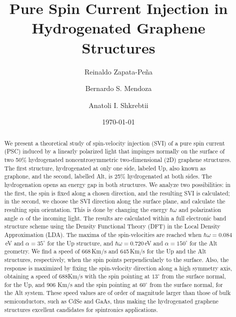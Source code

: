 \documentclass[floatfix,prb,aps,superscriptaddress,showpacs,11pt,preprint,letterpaper]{revtex4}
\begin{document}
\title{Pure Spin Current Injection in Hydrogenated Graphene Structures}
\author{Reinaldo Zapata-Pe\~na}
\author{Bernardo S. Mendoza}
\author{Anatoli I. Shkrebtii}

\date{\today}

\begin{abstract}
We present a theoretical study of spin-velocity injection (SVI) of a pure spin
current (PSC) induced by  a linearly polarized light that impinges normally on
the surface of  two 50\% hydrogenated noncentrosymmetric two-dimensional (2D)
graphene structures. The first structure, hydrogenated at only one side,
labeled Up, also known as graphone, and the second, labelled Alt, is
25\% hydrogenated at both sides. The hydrogenation opens an energy gap in both
structures. We analyze two possibilities: in the first, the spin is fixed
along a chosen direction, and the resulting SVI is calculated;
in the second, we choose the SVI direction along
the surface plane, and calculate the resulting
spin orientation. This is done by changing the energy
$\hbar\omega$ and polarization angle $\alpha$  of the incoming  light. The
results are calculated within a full electronic band structure scheme using the
Density Functional Theory (DFT) in the Local Density Approximation (LDA). The
maxima of the spin-velocities are reached when $\hbar\omega=0.084$\,eV and
$\alpha=35^\circ$ for the Up structure, and $\hbar\omega=0.720$\,eV and
$\alpha=150^\circ$ for the Alt geometry. We find a speed of 668\,Km/s and
645\,Km/s for the Up and the Alt structures, respectively, when the spin points
perpendicularly to the surface. Also, the response is maximized by
fixing the spin-velocity direction 
along a high symmetry  axis, obtaining a speed of 688Km/s
with the spin pointing at $13^\circ$ from the surface normal, for the Up, 
and 906 Km/s and the spin pointing at $60^\circ$ from the surface normal, for
the Alt system. These speed values are of order of magnitude larger than those of bulk semiconductors,
such as CdSe and GaAs, thus making the hydrogenated graphene structures
excellent candidates for spintronics applications. 
\end{abstract}

\maketitle
\end{document}
